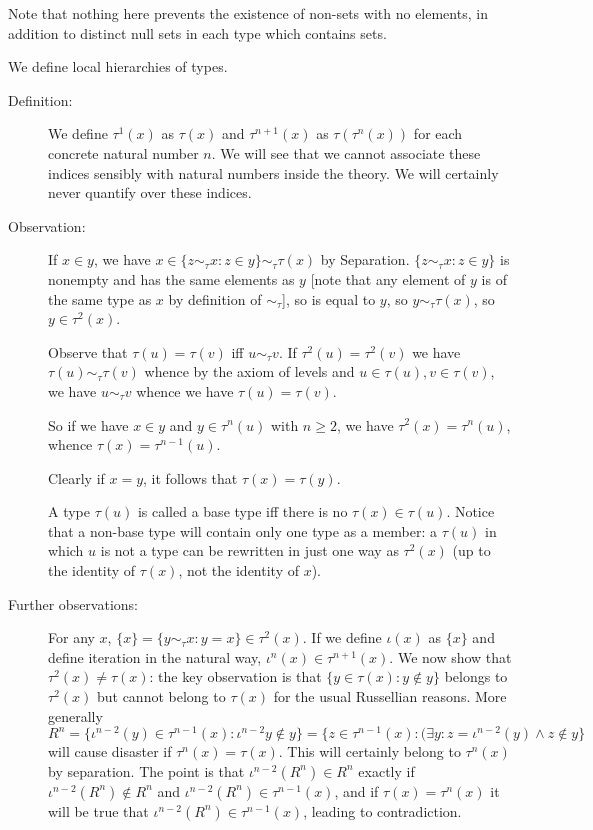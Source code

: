 \documentclass[12pt]{article}
\begin{document}
Note that nothing here prevents the existence of non-sets with no elements, in addition to distinct null sets in each type which contains sets.

We define local hierarchies of types.

\begin{description}

\item[Definition:]  We define $\tau^1(x)$ as $\tau(x)$ and $\tau^{n+1}(x)$ as $\tau(\tau^n(x))$ for each concrete natural number $n$.  We will see that we cannot
associate these indices sensibly with natural numbers inside the theory.  We will certainly never quantify over these indices.

\item[Observation:]   If $x \in y$, we have $x \in \{z \sim_\tau x:z \in y\} \sim_\tau \tau(x)$ by Separation.  $\{z \sim_\tau x:z \in y\}$ is nonempty and has the same elements as
$y$ [note that any element of $y$ is of the same type as $x$ by definition of $\sim_\tau$], so is equal to $y$, so $y \sim_\tau \tau(x)$, so $y \in \tau^2(x)$.

Observe that $\tau(u) = \tau(v)$ iff  $u \sim_\tau v$.  If $\tau^2(u) = \tau^2(v)$ we have $\tau(u) \sim_\tau \tau(v)$  whence by the axiom of levels and $u \in \tau(u),v \in \tau(v)$,  we have $u \sim_\tau v$ whence we have $\tau(u)=\tau(v)$.

So if we have $x \in y$ and $y \in \tau^n(u)$ with $n \geq 2$, we have $\tau^2(x) = \tau^n(u)$, whence $\tau(x) = \tau^{n-1}(u)$.

Clearly if $x=y$, it follows that $\tau(x)=\tau(y)$.

A type $\tau(u)$ is called a base type iff there is no $\tau(x) \in \tau(u)$.  Notice that a non-base type will contain only one type as a member:  a $\tau(u)$ in which $u$ is
not a type can be rewritten in just one way as $\tau^2(x)$ (up to the identity of $\tau(x)$, not the identity of $x$).

\item[Further observations:]  For any $x$, $\{x\} = \{y \sim_\tau x:y=x\} \in \tau^2(x)$.  If we define $\iota(x)$ as $\{x\}$ and define iteration in the natural way,
$\iota^n(x) \in \tau^{n+1}(x)$.   We now show that $\tau^2(x) \neq \tau(x)$:  the key observation is that $\{y \in \tau(x):y \not\in y\}$ belongs to $\tau^2(x)$  but cannot belong to $\tau(x)$ for the usual Russellian reasons.    More generally $R^n = \{\iota^{n-2}(y) \in \tau^{n-1}(x):\iota^{n-2}y \not\in y\} = \{z \in \tau^{n-1}(x):(\exists y:z = \iota^{n-2}(y) \wedge z \not\in y\}$ will cause disaster if $\tau^n(x) = \tau(x)$.   This will certainly belong to
$\tau^n(x)$ by separation.  The point is that $\iota^{n-2}(R^n) \in R^n$ exactly if $\iota^{n-2}(R^n) \not\in R^n$ and $\iota^{n-2}(R^n) \in \tau^{n-1}(x)$, and if $\tau(x) = \tau^n(x)$
it will be true that $\iota^{n-2}(R^n) \in \tau^{n-1}(x)$, leading to contradiction.


\end{description}
\end{document}
